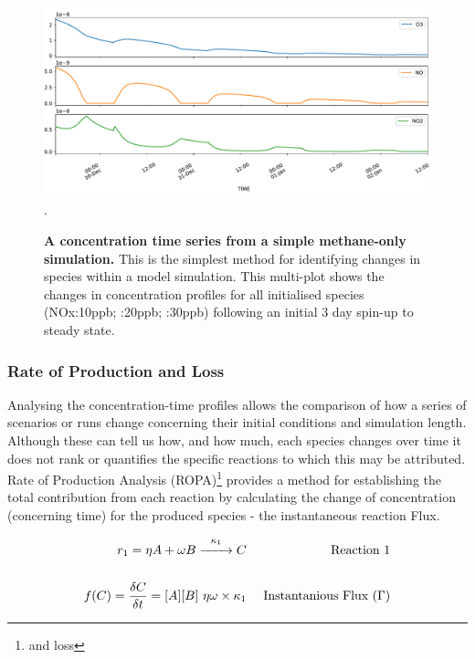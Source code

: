 \begin{figure}[H]
     \centering
         \includegraphics[width=.85\textwidth]{figures/ch2concentration.pdf}\\
         .
        \caption{\textbf{A concentration time series from a simple methane-only simulation.} This is the simplest method for identifying changes in species within a model simulation. This multi-plot shows the changes in concentration profiles for all initialised species (NOx:10ppb; :20ppb; :30ppb) following an initial 3 day spin-up to steady state. }
        \label{fig:concentration}
\end{figure}

\subsubsection{Rate of Production and Loss}

Analysing the concentration-time profiles allows the comparison of how a series of scenarios or runs change concerning their initial conditions and simulation length. Although these can tell us how, and how much, each species changes over time it does not rank or quantifies the specific reactions to which this may be attributed. Rate of Production Analysis (ROPA)\footnote{and loss} provides a method for establishing the total contribution from each reaction by calculating the change of concentration (concerning time) for the produced species - the instantaneous reaction Flux.

\begin{eqnarray}
  r_1 = \eta A + \omega B \overset{\kappa_1}{\xrightarrow{\hspace*{7mm}}} C & & \text{ Reaction 1}\\[15pt]
  f(C) = \dfrac{\delta C}{\delta t} =  [A][B]\  \eta \omega \times \kappa_1                      & & \text{ Instantanious Flux }(\Gamma) \label{eqn:ode}
\end{eqnarray}

